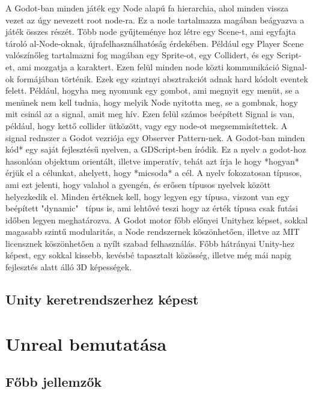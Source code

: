 \documentclass[
]{thesis-ekf}
\theoremstyle{definition}
\theoremstyle{remark}
\begin{document}
A Godot-ban minden játék egy Node\cite{GodotKeyConcepts} alapú fa hierarchia, ahol minden vissza vezet az úgy nevezett root node-ra\cite{GodotKeyConcepts}. Ez a node tartalmazza magában beágyazva a játék összes részét. 
Több node gyűjteménye hoz létre egy Scene-t\cite{GodotKeyConcepts}, ami egyfajta tároló al-Node-oknak, újrafelhasználhatóság érdekében. Például egy Player Scene valószínőleg tartalmazni fog magában egy Sprite-ot, egy Collidert, és egy Script-et, ami mozgatja a karaktert.
Ezen felül minden node közti kommunikáció Signal-ok\cite{GodotKeyConcepts} formájában történik. Ezek egy szintnyi absztrakciót adnak hard kódolt eventek felett. Például, hogyha meg nyomunk egy gombot, ami megnyit egy menüt, se a menünek nem kell tudnia, hogy melyik Node nyitotta meg, se a gombnak, hogy mit csinál az a signal, amit meg hív. Ezen felül számos beépített Signal is van, például, hogy kettő collider ütközött, vagy egy node-ot megsemmisítettek. A signal rednszer a Godot vezriója egy Observer Pattern-nek.\cite{ObserverPattern}
A Godot-ban minden kód* egy saját fejlesztésű nyelven, a GDScript-ben\cite{GDScript} íródik. Ez a nyelv a godot-hoz hasonlóan objektum orientált, illetve imperatív, tehát azt írja le hogy *hogyan* érjük el a célunkat, ahelyett, hogy *micsoda* a cél. A nyelv fokozatosan típusos\cite{GradualTyping}, ami ezt jelenti, hogy valahol a gyengén, és erősen típusos nyelvek között helyezkedik el. Minden értéknek kell, hogy legyen egy típusa, viszont van egy beépített "dynamic"~ típus is, ami lehtővé teszi hogy az érték típusa csak futási időben legyen meghatározva.
A Godot motor főbb előnyei Unityhez képset, sokkal magasabb szintű modularitás, a Node rendszernek köszönhetően, illetve az MIT licensznek köszönhetően a nyílt szabad felhasználás.
Főbb hátrányai Unity-hez képest, egy sokkal kissebb, kevésbé tapasztalt közösség, illetve még mái napig fejlesztés alatt álló 3D képességek.
\subsection{Unity keretrendszerhez képest}


\section{Unreal bemutatása}  %

\subsection{Főbb jellemzők}
\end{document}
